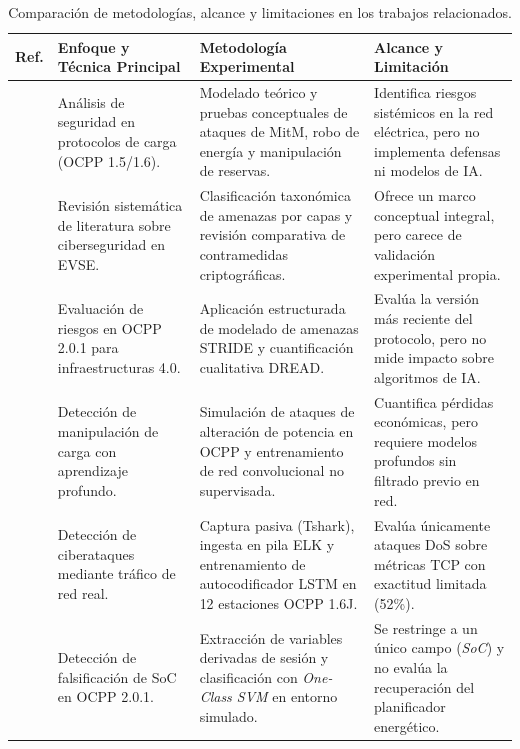 \documentclass[conference]{IEEEtran}
\begin{document}
\begin{table}[t]
\centering
\caption{Comparación de metodologías, alcance y limitaciones en los trabajos relacionados.}
\label{tab:relacionados}
\footnotesize
\setlength{\tabcolsep}{4pt}
\begin{tabularx}{\textwidth}{c >{\raggedright\arraybackslash}p{4.2cm} >{\raggedright\arraybackslash}X >{\raggedright\arraybackslash}p{4.3cm}}
\toprule
\textbf{Ref.} & \textbf{Enfoque y Técnica Principal} & \textbf{Metodología Experimental} & \textbf{Alcance y Limitación} \\
\midrule
\cite{alcaraz2017} & Análisis de seguridad en protocolos de carga (OCPP 1.5/1.6). & Modelado teórico y pruebas conceptuales de ataques de MitM, robo de energía y manipulación de reservas. & Identifica riesgos sistémicos en la red eléctrica, pero no implementa defensas ni modelos de IA. \\
\addlinespace
\cite{garofalaki2022} & Revisión sistemática de literatura sobre ciberseguridad en EVSE. & Clasificación taxonómica de amenazas por capas y revisión comparativa de contramedidas criptográficas. & Ofrece un marco conceptual integral, pero carece de validación experimental propia. \\
\addlinespace
\cite{alcaraz2023} & Evaluación de riesgos en OCPP 2.0.1 para infraestructuras 4.0. & Aplicación estructurada de modelado de amenazas STRIDE y cuantificación cualitativa DREAD. & Evalúa la versión más reciente del protocolo, pero no mide impacto sobre algoritmos de IA. \\
\addlinespace
\cite{jahangir2024} & Detección de manipulación de carga con aprendizaje profundo. & Simulación de ataques de alteración de potencia en OCPP y entrenamiento de red convolucional no supervisada. & Cuantifica pérdidas económicas, pero requiere modelos profundos sin filtrado previo en red. \\
\addlinespace
\cite{terruggia2025} & Detección de ciberataques mediante tráfico de red real. & Captura pasiva (Tshark), ingesta en pila ELK y entrenamiento de autocodificador LSTM en 12 estaciones OCPP 1.6J. & Evalúa únicamente ataques DoS sobre métricas TCP con exactitud limitada (52\%). \\
\addlinespace
\cite{rahman2026} & Detección de falsificación de SoC en OCPP 2.0.1. & Extracción de variables derivadas de sesión y clasificación con \textit{One-Class SVM} en entorno simulado. & Se restringe a un único campo (\textit{SoC}) y no evalúa la recuperación del planificador energético. \\

\end{tabularx}
\end{table}
\end{document}
